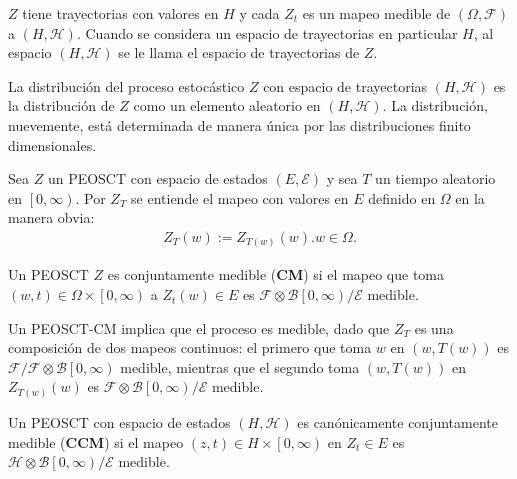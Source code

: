\begin{Note}
$Z$ tiene trayectorias con valores en $H$ y cada $Z_{t}$ es un mapeo medible de $\left(\Omega,\mathcal{F}\right)$ a $\left(H,\mathcal{H}\right)$. Cuando se considera un espacio de trayectorias en particular $H$, al espacio $\left(H,\mathcal{H}\right)$ se le llama el espacio de trayectorias de $Z$.
\end{Note}

\begin{Note}
La distribuci\'on del proceso estoc\'astico $Z$ con espacio de trayectorias $\left(H,\mathcal{H}\right)$ es la distribuci\'on de $Z$ como  un elemento aleatorio en $\left(H,\mathcal{H}\right)$. La distribuci\'on, nuevemente, est\'a determinada de manera \'unica por las distribuciones finito dimensionales.
\end{Note}


\begin{Def}
Sea $Z$ un PEOSCT  con espacio de estados $\left(E,\mathcal{E}\right)$ y sea $T$ un tiempo aleatorio en $\left[0,\infty\right)$. Por $Z_{T}$ se entiende el mapeo con valores en $E$ definido en $\Omega$ en la manera obvia:
\begin{eqnarray*}
Z_{T}\left(w\right):=Z_{T\left(w\right)}\left(w\right). w\in\Omega.
\end{eqnarray*}
\end{Def}

\begin{Def}
Un PEOSCT $Z$ es conjuntamente medible (\textbf{CM}) si el mapeo que toma $\left(w,t\right)\in\Omega\times\left[0,\infty\right)$ a $Z_{t}\left(w\right)\in E$ es $\mathcal{F}\otimes\mathcal{B}\left[0,\infty\right)/\mathcal{E}$ medible.
\end{Def}

\begin{Note}
Un PEOSCT-CM implica que el proceso es medible, dado que $Z_{T}$ es una composici\'on  de dos mapeos continuos: el primero que toma $w$ en $\left(w,T\left(w\right)\right)$ es $\mathcal{F}/\mathcal{F}\otimes\mathcal{B}\left[0,\infty\right)$ medible, mientras que el segundo toma $\left(w,T\left(w\right)\right)$ en $Z_{T\left(w\right)}\left(w\right)$ es $\mathcal{F}\otimes\mathcal{B}\left[0,\infty\right)/\mathcal{E}$ medible.
\end{Note}


\begin{Def}
Un PEOSCT con espacio de estados $\left(H,\mathcal{H}\right)$ es can\'onicamente conjuntamente medible (\textbf{CCM}) si el mapeo $\left(z,t\right)\in H\times\left[0,\infty\right)$ en $Z_{t}\in E$ es $\mathcal{H}\otimes\mathcal{B}\left[0,\infty\right)/\mathcal{E}$ medible.
\end{Def}

